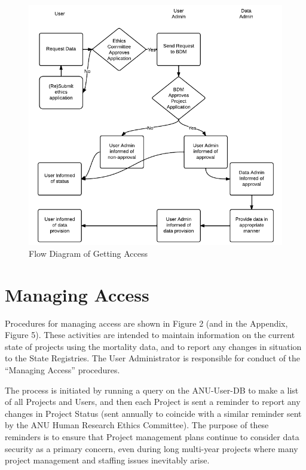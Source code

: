 \documentclass[a4paper]{article}
\begin{document}
\begin{figure}[!h]
\centering
\includegraphics[width=1\textwidth]{DataAccessFlowDiagram-GettingAccess-general.png}
\caption{Flow Diagram of Getting Access}
\label{fig:DataAccessFlowDiagram-GettingAccess}
\end{figure}
\clearpage
\section{Managing Access}
\label{sec-3}

Procedures for managing access are shown in Figure 2 (and in the Appendix, Figure 5). These activities are intended to maintain information on the current state of projects using the mortality data, and to report any changes in situation to the State Registries. The User Administrator is responsible for conduct of the ``Managing Access'' procedures.

The process is initiated by running a query on the ANU-User-DB to make a list of all Projects and Users, and then each Project is sent a reminder to report any changes in Project Status (sent annually to coincide with a similar reminder sent by the ANU Human Research Ethics Committee). The purpose of these reminders is to ensure that Project management plans continue to consider data security as a primary concern, even during long multi-year projects where many project management and staffing issues inevitably arise.
\end{document}
